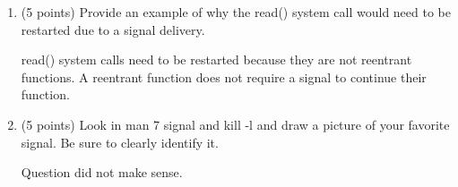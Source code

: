\documentclass{article}[9pt]
\newenvironment{answerfont}{\fontfamily{qhv}\selectfont}{\par}
\newenvironment{myanswer}{\begin{mdframed}\begin{answerfont}}{\end{answerfont}\end{mdframed}}
\begin{document}
\begin{enumerate}
\item (5 points) Provide an example of why the read() system call would need to be restarted due to a signal delivery.

  \begin{myanswer}
  read() system calls need to be restarted because they are not reentrant functions. A reentrant function does not require a signal to continue their function.
  \end{myanswer}

\item (5 points) Look in man 7 signal and kill -l and draw a picture of your favorite signal. Be sure to clearly identify it.

  \begin{myanswer}
  Question did not make sense. 
  \end{myanswer}

\end{enumerate}
\end{document}
